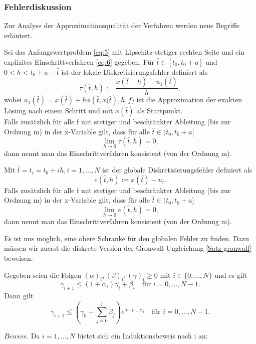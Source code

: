 \subsubsection{Fehlerdiskussion}
Zur Analyse der Approximationsqualität der Verfahren werden neue Begriffe erläutert.
\begin{definition}
    Sei das Anfangswertproblem \eqref{eq:5} mit Lipschitz-stetiger
    rechten Seite und ein explizites Einschrittverfahren \eqref{eq:6} gegeben. Für $\hat{t}\in [t_0,t_0+a]$ und
    $0 < h < t_0 + a - \hat{t}$ ist der lokale Diskretisierungsfehler definiert als
    \[
        \tau(\hat{t}, h) := \frac{x(\hat{t} + h) - u_1(\hat{t})}{h},
    \] wobei $u_1(\hat{t})=x(\hat{t}) + h\phi\left(\hat{t},x(\hat{t}\right),h,f) $ ist die Approximation der exakten
    Lösung nach einem Schritt und mit $x(\hat{t})$ als Startpunkt.\\
    Falls zusätzlich für alle f mit stetiger und beschränkter Ableitung (bis zur Ordnung m) in der x-Variable gilt, dass
    für alle $\hat{t} \in (t_0, t_0+a]$
    \[
        \lim_{h \rightarrow 0 } \tau(\hat{t}, h)=0,
    \] dann nennt man das Einschrittverfahren konsistent (von der Ordnung m).
\end{definition}
\begin{definition}
    Mit $\hat{t} = t_i = t_0+ih, i=1,\dots, N$ ist der globale Diskretisierungsfehler definiert als
    \[
        e(\hat{t}, h) := x(\hat{t}) - u_i.
    \]
    Falls zusätzlich für alle f mit stetiger und beschränkter Ableitung (bis zur Ordnung m) in der x-Variable gilt, dass
    für alle $\hat{t} \in (t_0, t_0+a]$
    \[
        \lim_{h \rightarrow 0 } e(\hat{t}, h)=0,
    \] dann nennt man das Einschrittverfahren konsistent (von der Ordnung m).
\end{definition}
Es ist uns möglich, eine obere Schranke für den globalen Fehler zu finden. Dazu müssen wir zuerst die diskrete Version
der Gronwall Ungleichung \ref{Satz-gronwall} beweisen.
\begin{satz}
    Gegeben seien die Folgen $(\alpha)_i,(\beta)_i,(\gamma)_i \geq 0$ mit $i \in \{0,\dots,N\}$ und es gilt
    \[
        \gamma_{i+1} \leq (1 + \alpha_i)\gamma_i + \beta_i \quad \text{für } i=0,\dots,N-1.
    \] Dann gilt
    \[
        \gamma_{i+1} \leq \left( \gamma_0 + \sum_{j=0}^{i}\beta_j \right) e^{\alpha_0 + \dots \alpha_i}  \quad
        \text{für } i=0, \dots, N-1.
    \]
\end{satz}
$Beweis.$ Da $i=1,\dots,N$ bietet sich ein Induktionsbeweis nach i an:
